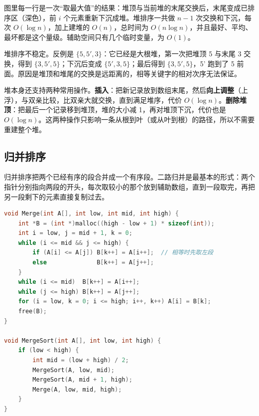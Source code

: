 图里每一行是一次“取最大值”的结果：堆顶与当前堆的末尾交换后，末尾变成已排序区（深色），前 $i$ 个元素重新下沉成堆。堆排序一共做 $n-1$ 次交换和下沉，每次 $O(\log n)$，加上建堆的 $O(n)$，总时间为 $O(n\log n)$，并且最好、平均、最坏都是这个量级。辅助空间只有几个临时变量，为 $O(1)$。

堆排序不稳定。反例是 $\{5,5',3\}$：它已经是大根堆，第一次把堆顶 5 与末尾 3 交换，得到 $\{3,5',5\}$；下沉后变成 $\{5',3,5\}$；最后得到 $\{3,5',5\}$，5' 跑到了 5 前面。原因是堆顶和堆尾的交换是远距离的，相等关键字的相对次序无法保证。

堆本身还支持两种常用操作。\textbf{插入}：把新记录放到数组末尾，然后\textbf{向上调整}（上浮），与双亲比较，比双亲大就交换，直到满足堆序，代价 $O(\log n)$。\textbf{删除堆顶}：把最后一个记录移到堆顶，堆的大小减 1，再对堆顶下沉，代价也是 $O(\log n)$。这两种操作只影响一条从根到叶（或从叶到根）的路径，所以不需要重建整个堆。

\subsection{归并排序}

归并排序把两个已经有序的段合并成一个有序段。二路归并是最基本的形式：两个指针分别指向两段的开头，每次取较小的那个放到辅助数组，直到一段取完，再把另一段剩下的元素直接复制过去。

\begin{lstlisting}[language=C]
void Merge(int A[], int low, int mid, int high) {
    int *B = (int *)malloc((high - low + 1) * sizeof(int));
    int i = low, j = mid + 1, k = 0;
    while (i <= mid && j <= high) {
        if (A[i] <= A[j]) B[k++] = A[i++];  // 相等时先取左段
        else              B[k++] = A[j++];
    }
    while (i <= mid)  B[k++] = A[i++];
    while (j <= high) B[k++] = A[j++];
    for (i = low, k = 0; i <= high; i++, k++) A[i] = B[k];
    free(B);
}

void MergeSort(int A[], int low, int high) {
    if (low < high) {
        int mid = (low + high) / 2;
        MergeSort(A, low, mid);
        MergeSort(A, mid + 1, high);
        Merge(A, low, mid, high);
    }
}
\end{lstlisting}

